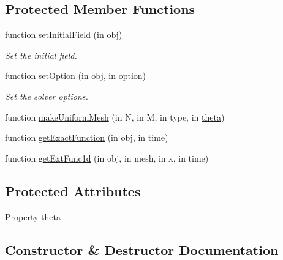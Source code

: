 \subsection*{Protected Member Functions}
\begin{DoxyCompactItemize}
\item 
function \hyperlink{class_dam_break_dry_uniform_mesh2d_a0c70db82f10cbcc7626b9595c994cf58}{set\+Initial\+Field} (in obj)
\begin{DoxyCompactList}\small\item\em Set the initial field. \end{DoxyCompactList}\item 
function \hyperlink{class_dam_break_dry_uniform_mesh2d_ad925a23b16ee3cd4d342c2b871064286}{set\+Option} (in obj, in \hyperlink{class_ndg_phys_af91f4c54b93504e76b38a5693774dff1}{option})
\begin{DoxyCompactList}\small\item\em Set the solver options. \end{DoxyCompactList}\item 
function \hyperlink{class_dam_break_dry_uniform_mesh2d_a5248080462b718729218e3af169fc59c}{make\+Uniform\+Mesh} (in N, in M, in type, in \hyperlink{class_dam_break_dry_uniform_mesh2d_a9081a911c9c984f7f7ce43963ff2758c}{theta})
\item 
function \hyperlink{class_dam_break_dry_uniform_mesh2d_aed63c0dc9930be6c315257c3e3062653}{get\+Exact\+Function} (in obj, in time)
\item 
function \hyperlink{class_dam_break_dry_uniform_mesh2d_a5f3bbf41ec7ccf8c785e209a38cb74b3}{get\+Ext\+Func1d} (in obj, in mesh, in x, in time)
\end{DoxyCompactItemize}
\subsection*{Protected Attributes}
\begin{DoxyCompactItemize}
\item 
Property \hyperlink{class_dam_break_dry_uniform_mesh2d_a9081a911c9c984f7f7ce43963ff2758c}{theta}
\end{DoxyCompactItemize}


\subsection{Constructor \& Destructor Documentation}
\mbox{\label{class_dam_break_dry_uniform_mesh2d_adb07e7c79f219ee3928c69c8414abbfc}} 
